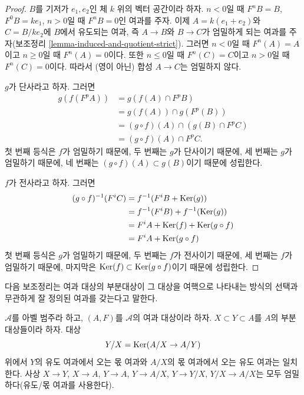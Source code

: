 \begin{proof}
$B$를 기저가 $e_1, e_2$인 체 $k$ 위의 벡터 공간이라 하자.
$n < 0$일 때 $F^nB = B$, $F^0B = ke_1$, $n > 0$일 때
$F^nB = 0$인 여과를 주자. 이제 $A = k(e_1 + e_2)$와
$C = B/ke_2$에 $B$에서 유도되는 여과, 즉 $A \to B$와
$B \to C$가 엄밀하게 되는 여과를 주자(보조정리
\ref{lemma-induced-and-quotient-strict}). 그러면 $n < 0$일 때
$F^n(A) = A$이고 $n \geq 0$일 때 $F^n(A) = 0$이다.
또한 $n \leq 0$일 때 $F^n(C) = C$이고 $n > 0$일 때
$F^n(C) = 0$이다. 따라서 (영이 아닌) 합성 $A \to C$는 엄밀하지 않다.

\medskip\noindent
$g$가 단사라고 하자. 그러면
\begin{align*}
g(f(F^pA)) & = g(f(A) \cap F^pB) \\
& = g(f(A)) \cap g(F^p(B)) \\
& = (g \circ f)(A) \cap (g(B) \cap F^pC) \\
& = (g \circ f)(A) \cap F^pC.
\end{align*}
첫 번째 등식은 $f$가 엄밀하기 때문에, 두 번째는 $g$가 단사이기 때문에,
세 번째는 $g$가 엄밀하기 때문에, 네 번째는
$(g \circ f)(A) \subset g(B)$이기 때문에 성립한다.

\medskip\noindent
$f$가 전사라고 하자. 그러면
\begin{align*}
(g \circ f)^{-1}(F^iC) & = f^{-1}(F^iB + \mathop{\mathrm{Ker}}(g)) \\
& = f^{-1}(F^iB) + f^{-1}(\mathop{\mathrm{Ker}}(g)) \\
& = F^iA + \mathop{\mathrm{Ker}}(f) + \mathop{\mathrm{Ker}}(g \circ f) \\
& = F^iA + \mathop{\mathrm{Ker}}(g \circ f)
\end{align*}
첫 번째 등식은 $g$가 엄밀하기 때문에, 두 번째는 $f$가 전사이기 때문에,
세 번째는 $f$가 엄밀하기 때문에, 마지막은
$\mathop{\mathrm{Ker}}(f) \subset \mathop{\mathrm{Ker}}(g \circ f)$이기 때문에 성립한다.
\end{proof}

\noindent
다음 보조정리는 여과 대상의 부분대상이 그 대상을 여핵으로 나타내는
방식의 선택과 무관하게 잘 정의된 여과를 갖는다고 말한다.

\begin{lemma}
\label{lemma-filtration-subobject}
$\mathcal{A}$를 아벨 범주라 하고, $(A, F)$를 $\mathcal{A}$의 여과
대상이라 하자. $X \subset Y \subset A$를 $A$의 부분대상들이라 하자.
대상
$$
Y/X = \mathop{\mathrm{Ker}}(A/X \to A/Y)
$$
위에서 $Y$의 유도 여과에서 오는 몫 여과와 $A/X$의 몫 여과에서 오는
유도 여과는 일치한다. 사상
$X \to Y$, $X \to A$, $Y \to A$, $Y \to A/X$,
$Y \to Y/X$, $Y/X \to A/X$는 모두 엄밀하다(유도/몫 여과를 사용한다).
\end{lemma}

